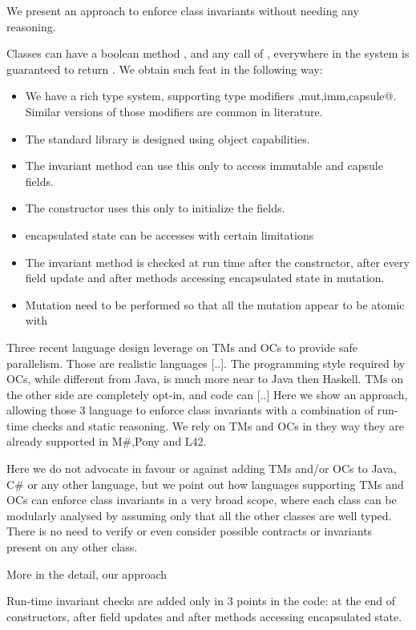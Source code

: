 We present an approach to enforce class invariants without needing any reasoning.

Classes can have a boolean method \Q@invariant@,
and any call of \Q@invariant@, everywhere in the system is guaranteed to return \Q@true@.
We obtain such feat in the following way:
\begin{itemize}
	\item We have a rich type system, supporting type modifiers \Q@read,mut,imm,capsule@. Similar versions of those modifiers are common in literature.
	\item The standard library is designed using object capabilities.
	\item The invariant method can use this only to access immutable and capsule fields.
	\item The constructor uses this only to initialize the fields.
	\item encapsulated state can be accesses with certain limitations
	\item The invariant method is checked at run time after the constructor, after every field update and
	after methods accessing encapsulated state in mutation.
	\item Mutation need to be performed so that all the mutation appear to be atomic with 
\end{itemize}
\LINE

Three recent language design leverage on TMs and OCs to provide safe parallelism.
Those are realistic languages [..].
The programming style required by OCs, while different from Java, is much more near to Java then Haskell. TMs on the other side are completely opt-in, and code can [..]
Here we show an approach, allowing those 3 language 
to  enforce class invariants with a combination of run-time checks and static reasoning.
We rely on TMs and OCs in they way they are already supported in M\#,Pony and L42.

Here we do not advocate in favour or against adding
TMs and/or OCs to Java, C\# or any other language, but we point out how languages supporting TMs and OCs can
enforce class invariants in a very broad scope, where
each class can be modularly analysed by assuming only that all the other classes are well typed.
There is no need to verify or even consider possible contracts or invariants present on any other class.

\LINE
More in the detail, our approach 

Run-time invariant checks are added only in 3 points in the code: at the end of constructors, after field updates and after methods accessing encapsulated state.


